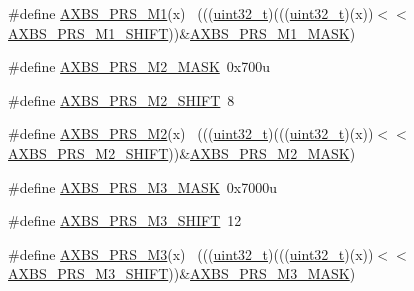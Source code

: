 \begin{DoxyCompactItemize}
\#define \hyperlink{group___a_x_b_s___register___masks_ga6ae77cbf64e41e6732945b6315dd3a7e}{A\+X\+B\+S\+\_\+\+P\+R\+S\+\_\+\+M1}(x)                                                  ~(((\hyperlink{_p_e___types_8h_a33594304e786b158f3fb30289278f5af}{uint32\+\_\+t})(((\hyperlink{_p_e___types_8h_a33594304e786b158f3fb30289278f5af}{uint32\+\_\+t})(x))$<$$<$\hyperlink{group___a_x_b_s___register___masks_gab293a628aa64a93c04ba49fd27326592}{A\+X\+B\+S\+\_\+\+P\+R\+S\+\_\+\+M1\+\_\+\+S\+H\+I\+FT}))\&\hyperlink{group___a_x_b_s___register___masks_ga69131fbb37b2a3eef0e0f135e265e1c0}{A\+X\+B\+S\+\_\+\+P\+R\+S\+\_\+\+M1\+\_\+\+M\+A\+SK})
\item 
\#define \hyperlink{group___a_x_b_s___register___masks_gacd2feac8facc9d0b21f438eef172fd81}{A\+X\+B\+S\+\_\+\+P\+R\+S\+\_\+\+M2\+\_\+\+M\+A\+SK}~0x700u
\item 
\#define \hyperlink{group___a_x_b_s___register___masks_gacf78955a5852e31c71c1542d873df6b3}{A\+X\+B\+S\+\_\+\+P\+R\+S\+\_\+\+M2\+\_\+\+S\+H\+I\+FT}~8
\item 
\#define \hyperlink{group___a_x_b_s___register___masks_ga62c82426cf92f9a2296ab84014ee8096}{A\+X\+B\+S\+\_\+\+P\+R\+S\+\_\+\+M2}(x)                                                  ~(((\hyperlink{_p_e___types_8h_a33594304e786b158f3fb30289278f5af}{uint32\+\_\+t})(((\hyperlink{_p_e___types_8h_a33594304e786b158f3fb30289278f5af}{uint32\+\_\+t})(x))$<$$<$\hyperlink{group___a_x_b_s___register___masks_gacf78955a5852e31c71c1542d873df6b3}{A\+X\+B\+S\+\_\+\+P\+R\+S\+\_\+\+M2\+\_\+\+S\+H\+I\+FT}))\&\hyperlink{group___a_x_b_s___register___masks_gacd2feac8facc9d0b21f438eef172fd81}{A\+X\+B\+S\+\_\+\+P\+R\+S\+\_\+\+M2\+\_\+\+M\+A\+SK})
\item 
\#define \hyperlink{group___a_x_b_s___register___masks_gab4b4274fe732ec08377a17c98fcb3c89}{A\+X\+B\+S\+\_\+\+P\+R\+S\+\_\+\+M3\+\_\+\+M\+A\+SK}~0x7000u
\item 
\#define \hyperlink{group___a_x_b_s___register___masks_gaf63a98f7cff8ba76061096736d5fa14e}{A\+X\+B\+S\+\_\+\+P\+R\+S\+\_\+\+M3\+\_\+\+S\+H\+I\+FT}~12
\item 
\#define \hyperlink{group___a_x_b_s___register___masks_ga2fa3a214a6e094d0460b17d28fe0754f}{A\+X\+B\+S\+\_\+\+P\+R\+S\+\_\+\+M3}(x)                                                  ~(((\hyperlink{_p_e___types_8h_a33594304e786b158f3fb30289278f5af}{uint32\+\_\+t})(((\hyperlink{_p_e___types_8h_a33594304e786b158f3fb30289278f5af}{uint32\+\_\+t})(x))$<$$<$\hyperlink{group___a_x_b_s___register___masks_gaf63a98f7cff8ba76061096736d5fa14e}{A\+X\+B\+S\+\_\+\+P\+R\+S\+\_\+\+M3\+\_\+\+S\+H\+I\+FT}))\&\hyperlink{group___a_x_b_s___register___masks_gab4b4274fe732ec08377a17c98fcb3c89}{A\+X\+B\+S\+\_\+\+P\+R\+S\+\_\+\+M3\+\_\+\+M\+A\+SK})
$$
\end{DoxyCompactItemize}
